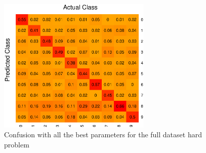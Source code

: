 \begin{figure}[H]
\centering
\includegraphics[width=0.65\textwidth]{graphics/tree_confusion_all}
\caption{Confusion with all the best parameters for the full dataset hard problem}
\label{fig:tree_confus_all}
\end{figure}